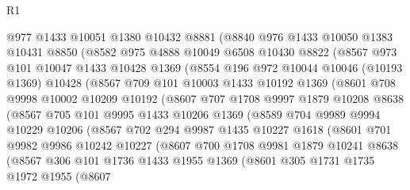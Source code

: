 \begin{lexlean}{R1}
\begin{coremodule}
      @977
      @1433
      @10051
      @1380
      @10432
      @8881
      (@8840
        @976
        @1433
        @10050
        @1383
        @10431
        @8850
        (@8582
          @975
          @4888
          @10049
          @6508
          @10430
          @8822
          (@8567
            @973
            @101
            @10047
            @1433
            @10428
            @1369
            (@8554
              @196
              @972
              @10044
              @10046
              (@10193 @1369)
              @10428
              (@8567
                @709
                @101
                @10003
                @1433
                @10192
                @1369
                (@8601
                  @708
                  @9998
                  @10002
                  @10209
                  @10192
                  (@8607
                    @707
                    @1708
                    @9997
                    @1879
                    @10208
                    @8638
                    (@8567
                      @705
                      @101
                      @9995
                      @1433
                      @10206
                      @1369
                      (@8589
                        @704
                        @9989
                        @9994
                        @10229
                        @10206
                        (@8567
                          @702
                          @294
                          @9987
                          @1435
                          @10227
                          @1618
                          (@8601
                            @701
                            @9982
                            @9986
                            @10242
                            @10227
                            (@8607
                              @700
                              @1708
                              @9981
                              @1879
                              @10241
                              @8638
                              (@8567
                                @306
                                @101
                                @1736
                                @1433
                                @1955
                                @1369
                                (@8601
                                  @305
                                  @1731
                                  @1735
                                  @1972
                                  @1955
                                  (@8607

\end{coremodule}
\end{lexlean}
